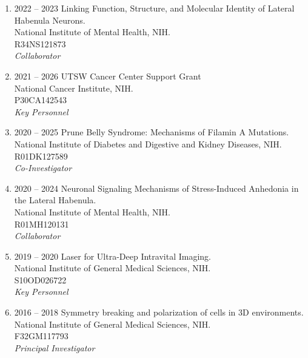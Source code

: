 \begin{enumerate}
\item 2022 -- 2023 
\hspace{8pt}
Linking Function, Structure, and Molecular Identity of Lateral Habenula Neurons. \\
National Institute of Mental Health, NIH. \\
R34NS121873 \\
{\it Collaborator}

\item 2021 -- 2026 
\hspace{8pt}
UTSW Cancer Center Support Grant \\
National Cancer Institute, NIH. \\
P30CA142543 \\ 
{\it Key Personnel}

\item 2020 -- 2025 
\hspace{8pt} 
Prune Belly Syndrome: Mechanisms of Filamin A Mutations. \\
National Institute of Diabetes and Digestive and Kidney Diseases, NIH. \\
R01DK127589 \\
{\it Co-Investigator} 

\item 2020 -- 2024
\hspace{8pt} 
Neuronal Signaling Mechanisms of Stress-Induced Anhedonia in the Lateral Habenula. \\
National Institute of Mental Health, NIH. \\
R01MH120131 \\ 
{\it Collaborator}

\item 2019 -- 2020 
\hspace{8pt} 
Laser for Ultra-Deep Intravital Imaging.\\
National Institute of General Medical Sciences, NIH. \\
S10OD026722 \\
{\it Key Personnel}

\item 2016 -- 2018 
\hspace{8pt} 
Symmetry breaking and polarization of cells in 3D environments.\\
National Institute of General Medical Sciences, NIH.\\
F32GM117793 \\
{\it Principal Investigator} 


\end{enumerate}
